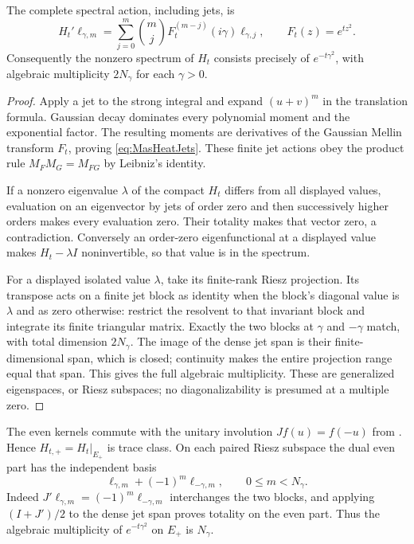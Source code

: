 The complete spectral action, including jets, is
\begin{equation}\label{eq:MasHeatJets}
 H_t'\ell_{\gamma,m}
 =\sum_{j=0}^m\binom mj
 F_t^{(m-j)}(i\gamma)\ell_{\gamma,j},
 \qquad F_t(z)=e^{tz^2}.
\end{equation}
Consequently the nonzero spectrum of $H_t$ consists precisely of $e^{-t\gamma^2}$, with algebraic multiplicity $2N_\gamma$ for each $\gamma>0$.
\begin{proof}
Apply a jet to the strong integral and expand $(u+v)^m$ in the translation formula. Gaussian decay dominates every polynomial moment and the exponential factor. The resulting moments are derivatives of the Gaussian Mellin transform $F_t$, proving \eqref{eq:MasHeatJets}. These finite jet actions obey the product rule $M_FM_G=M_{FG}$ by Leibniz's identity.

If a nonzero eigenvalue $\lambda$ of the compact $H_t$ differs from all displayed values, evaluation on an eigenvector by jets of order zero and then successively higher orders makes every evaluation zero. Their totality makes that vector zero, a contradiction. Conversely an order-zero eigenfunctional at a displayed value makes $H_t-\lambda I$ noninvertible, so that value is in the spectrum.

For a displayed isolated value $\lambda$, take its finite-rank Riesz projection. Its transpose acts on a finite jet block as identity when the block's diagonal value is $\lambda$ and as zero otherwise: restrict the resolvent to that invariant block and integrate its finite triangular matrix. Exactly the two blocks at $\gamma$ and $-\gamma$ match, with total dimension $2N_\gamma$. The image of the dense jet span is their finite-dimensional span, which is closed; continuity makes the entire projection range equal that span. This gives the full algebraic multiplicity. These are generalized eigenspaces, or Riesz subspaces; no diagonalizability is presumed at a multiple zero.
\end{proof}

The even kernels commute with the unitary involution $Jf(u)=f(-u)$ from . Hence $H_{t,+}=H_t|_{E_+}$ is trace class. On each paired Riesz subspace the dual even part has the independent basis
\[
 \ell_{\gamma,m}+(-1)^m\ell_{-\gamma,m},
 \qquad 0\le m<N_\gamma.
\]
Indeed $J'\ell_{\gamma,m}=(-1)^m\ell_{-\gamma,m}$ interchanges the two blocks, and applying $(I+J')/2$ to the dense jet span proves totality on the even part. Thus the algebraic multiplicity of $e^{-t\gamma^2}$ on $E_+$ is $N_\gamma$.

